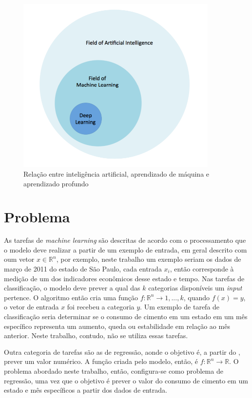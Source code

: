 \begin{figure}[H] 
  \includegraphics[width= 10cm]{../figuras/ia_ml.png}
  \caption{Relação entre inteligência artificial, aprendizado de máquina e aprendizado profundo \cite{dl-oreilly}}
\end{figure}

\section*{Problema}

As tarefas de \textit{machine learning} são descritas de acordo com o processamento que o modelo deve realizar a partir de um exemplo de entrada, em geral descrito com oum vetor $x \in \mathbb{R}^n$, por exemplo, neste trabalho um exemplo seriam os dados de março de 2011 do estado de São Paulo, cada entrada $x_i$, então corresponde à medição de um dos indicadores econômicos desse estado e tempo. Nas tarefas de classificação, o modelo deve prever a qual das $k$ categorias disponíveis um \textit{input} pertence. O algoritmo então cria uma função  $ f : \mathbb{R}^n \rightarrow {1,...,k}$,  quando $ f(x) = y$, o vetor de entrada $x$ foi recebeu a categoria $y$. Um exemplo de tarefa de classificação seria determinar se o consumo de cimento em um estado em um mês específico representa um aumento, queda ou estabilidade em relação ao mês anterior. Neste trabalho, contudo, não se utiliza essas tarefas.

Outra categoria de tarefas são as de regressão, aonde o objetivo é, a partir do , prever um valor numérico. A função criada pelo modelo, então, é $ f : \mathbb{R}^n \rightarrow \mathbb{R}$. O problema abordado neste trabalho, então, configura-se como problema de regressão, uma vez que o objetivo é prever o valor do consumo de cimento em um estado e mês específicos a partir dos dados de entrada.

